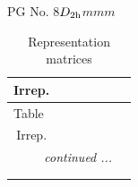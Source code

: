 \documentclass[fleqn,8pt,landscape]{jsarticle}
\begin{document}
\setcounter{MaxMatrixCols}{32}

\renewcommand{\tablename}{Table~}
\renewcommand{\figurename}{Figure~}
\begin{center}
\LARGE
PG No. 8\quad$D_{\rm 2h}$\quad$mmm$\quad[ orthorhombic ]
\end{center}
\renewcommand{\arraystretch}{1.2}
\begin{longtable}{ccccccc}
\caption{Representation matrices}
 \\
 \hline \hline
Irrep. &  &  &  &  &  &  \\ \hline \endfirsthead

\multicolumn{6}{l}{\tablename\ \thetable{}} \\
 \hline \hline
Irrep. &  &  &  &  &  &  \\ \hline \endhead

 \hline \hline
\multicolumn{6}{r}{\footnotesize\it continued ...} \\ \endfoot

 \hline \hline
\multicolumn{6}{r}{} \\ \endlastfoot


\end{longtable}
\end{document}
